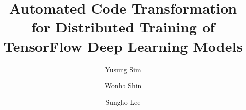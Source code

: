 \documentclass[sn-aps]{sn-jnl}%
\begin{document}
\title{Automated Code Transformation for Distributed Training of TensorFlow Deep Learning Models}

\author[1]{Yusung Sim}

\author[1]{Wonho Shin}

\author[2]{Sungho Lee}






\end{document}
